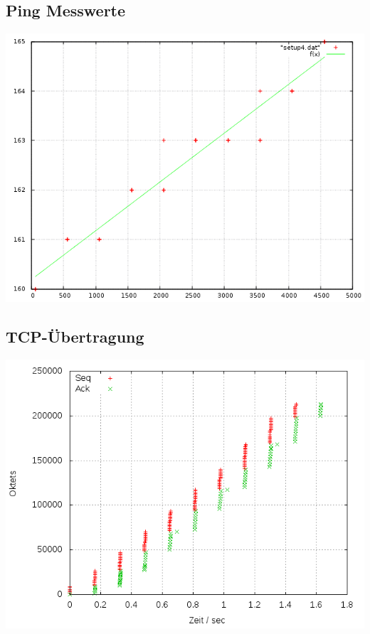 \documentclass[a4paper,10pt]{article}
\begin{document}
\subsection{Ping Messwerte}
\includegraphics[scale=0.75]{ping_setup_wan2.png}

\subsection{TCP-Übertragung}
\includegraphics[scale=0.75]{setup_wan2.png}
\end{document}
